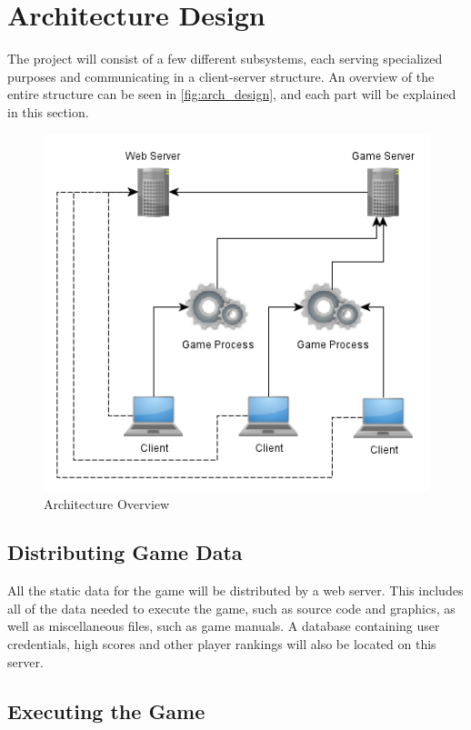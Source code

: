 \section{Architecture Design}
\label{sec:architecture_design}

The project will consist of a few different subsystems, each serving specialized purposes and communicating in a client-server structure. An overview of the entire structure can be seen in \autoref{fig:arch_design}, and each part will be explained in this section.

\begin{figure}[ht]
\includegraphics[width=\textwidth]{img/architecture-design.png}
\caption{Architecture Overview}
\label{fig:arch_design}
\end{figure}

\subsection{Distributing Game Data}

All the static data for the game will be distributed by a web server. This includes all of the data needed to execute the game, such as source code and graphics, as well as miscellaneous files, such as game manuals. A database containing user credentials, high scores and other player rankings will also be located on this server.

\subsection{Executing the Game}

